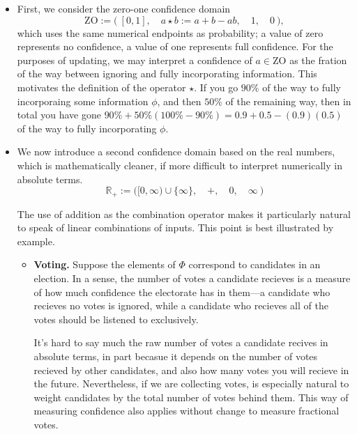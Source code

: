 \documentclass{article}
\def\ZO{\mathrm{ZO}}
\def\Rplus{\mathbb R_+}
\begin{document}
\begin{itemize}
	\item 
	First, we consider the zero-one confidence domain
	\[
		\ZO := \Big(~ [0,1],
			\quad a \star b := 
					a + b - ab,
			\quad 1,
			\quad 0 ~\Big),
	\]
	which uses the same numerical endpoints as probability;
	a value of zero represents no confidence, a value of one represents full confidence.
	For the purposes of updating, we may interpret a confidence of $a \in \ZO$ as the fration of the way between ignoring and fully incorporating information. 
	This motivates the definition of the operator $\star$.
	If you go $90\%$ of the way to fully incorporaing some information $\phi$, and then $50\%$ of the remaining way, then in total you have gone $90\% + 50\%(100\%-90\%) = 0.9 + 0.5 - (0.9)(0.5)$ of the way to fully incorporating $\phi$.    
	
	\item
	We now introduce a second confidence domain based on the real numbers,
	which is mathematically cleaner, if
		more difficult to interpret numerically in absolute terms.
	\[
		\Rplus := 
			\Big([0, \infty) \cup \{\infty\}, 
				\quad +,
				\quad 0,
				\quad \infty
				~\Big)
	\]
	
	The use of addition as the combination operator makes it particularly natural to speak of linear combinations of inputs. 
	This point is best illustrated by example.
	
	\begin{itemize}
		\item \textbf{Voting.}  
		Suppose the elements of $\Phi$ correspond to candidates in an election.
		In a sense, the number of votes a candidate recieves is a measure of how much confidence the electorate has in them---a candidate who recieves no votes is ignored, while a candidate who recieves all of the votes should be listened to exclusively.
		
		It's hard to say much  the raw number of votes a candidate recives in absolute terms, in part becasue it depends on the number of votes recieved by other candidates, and also how many votes you will recieve in the future. 
		Nevertheless, if we are collecting votes, is especially natural to weight candidates by the total number of votes behind them. 
		This way of measuring confidence also applies without change to measure fractional votes.
		 

\end{itemize}
\end{itemize}
\end{document}
